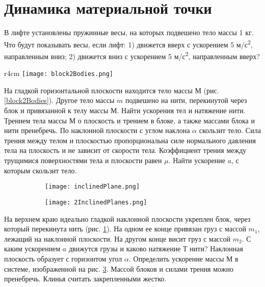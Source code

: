 \section{Динамика материальной точки}
\AddProb В лифте установлены пружинные весы, на которых подвешено тело массы 1 кг. Что будут показывать весы, если лифт: 1) движется вверх с ускорением 5 м/с\textsuperscript{2}, направленным вниз; 2) движется вниз с ускорением 5 м/с\textsuperscript{2}, направленным вверх?

\begin{wrapfigure}[10]{r}{4cm}
\texttt{[image: block2Bodies.png]}
\caption{}
\label{block2Bodies}
\end{wrapfigure}
\AddProb На гладкой горизонтальной плоскости находится тело массы $М$ (рис. \ref{block2Bodies}). Другое тело массы $m$ подвешено на нити, перекинутой через блок и привязанной к телу массы $М$. Найти ускорения тел и натяжение нити. Трением тела массы $М$ о плоскость и трением в блоке, а также массами блока и нити пренебречь.
\AddProb По наклонной плоскости с углом наклона $\alpha$ скользит тело. Сила трения между телом и плоскостью пропорциональна силе нормального давления тела на плоскость и не зависит от скорости тела. Коэффициент трения между трущимися поверхностями тела и плоскости равен $\mu$. Найти ускорение $a$, с которым скользит тело.

\begin{figure}[h]
\centering
\begin{subfigure}{.43\textwidth}
  \centering
  \texttt{[image: inclinedPlane.png]}
  \caption{}
  \label{inclinedPlane}
\end{subfigure}%
\begin{subfigure}{.57\textwidth}
  \centering
  \texttt{[image: 2InclinedPlanes.png]}
  \caption{}
  \label{2InclinedPlanes}
\end{subfigure}
\caption{}
\end{figure}

\AddProb На верхнем краю идеально гладкой наклонной плоскости укреплен блок, через который перекинута нить (рис. \ref{inclinedPlane}). На одном ее конце привязан груз с массой $m_1$, лежащий на наклонной плоскости. На другом конце висит груз с массой $m_2$. С каким ускорением $a$ движутся грузы и каково натяжение $Т$ нити? Наклонная плоскость образует с горизонтом угол $\alpha$.
\AddProb Определить ускорение массы $М$ в системе, изображенной на рис. \ref{2InclinedPlanes}. Массой блоков и силами трения можно пренебречь. Клинья считать закрепленными жестко.

